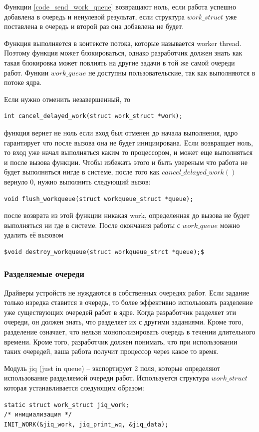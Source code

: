 Функции \ref{code_send_work_queue} возвращают ноль, если работа успешно добавлена в очередь и ненулевой результат, если структура $work\_struct$ уже поставлена в очередь и второй раз она добавлена не будет.

Функция выполняется в контексте потока, которые называется worker thread. Поэтому функция может блокироваться, однако разработчик должен знать как такая блокировка может повлиять на другие задачи в той же самой очереди работ. Функии $work\_queue$ не доступны пользовательские, так как выполняются в потоке ядра. 

Если нужно отменить незавершенный, то 
\begin{lstlisting}
int cancel_delayed_work(struct work_struct *work);
\end{lstlisting}
функция вернет не ноль если вход был отменен до начала выполнения, ядро гарантирует что после вызова она не будет инициирована. Если возвращает ноль, то вход уже начал выполняться каким то процессором, и может еще выполняться и после вызова функции. Чтобы избежать этого и быть увереным что работа не будет выполняться нигде в системе, после того как $cancel\_delayed\_work()$ вернуло 0, нужно выполнить следующий вызов:
\begin{lstlisting}
void flush_workqueue(struct workqueue_struct *queue);
\end{lstlisting}
после возврата из этой функции никакая work, определенная до вызова не будет выполняться ни где в системе. После окончания работы с $work\_queue$ можно удалить её вызовом
\begin{lstlisting}
$void destroy_workqueue(struct workqueue_strct *queue);$
\end{lstlisting}

\subsubsection{Разделяемые очереди}
Драйверы устройств не нуждаются в собственных очередях работ. Если задание только изредка ставится в очередь, то более эффективно использовать разделение уже существующих очередей работ в ядре. Когда разработчик разделяет эти очереди, он должен знать, что разделяет их с другими заданиями. Кроме того, разделение означает, что нельзя монополизировать очередь в течении длительного времени. Кроме того, разработчик должен понимать, что при использовании таких очередей, ваша работа получит процессор через какое то время.

Модуль jiq (just in queue) – экспортирует  2 поля, которые определяют использование разделяемой очереди работ. Используется структура $work\_struct$ которая устанавливается следующим образом:
\begin{lstlisting}
static struct work_struct jiq_work;
/* инициализация */
INIT_WORK(&jiq_work, jiq_print_wq, &jiq_data);
\end{lstlisting}

